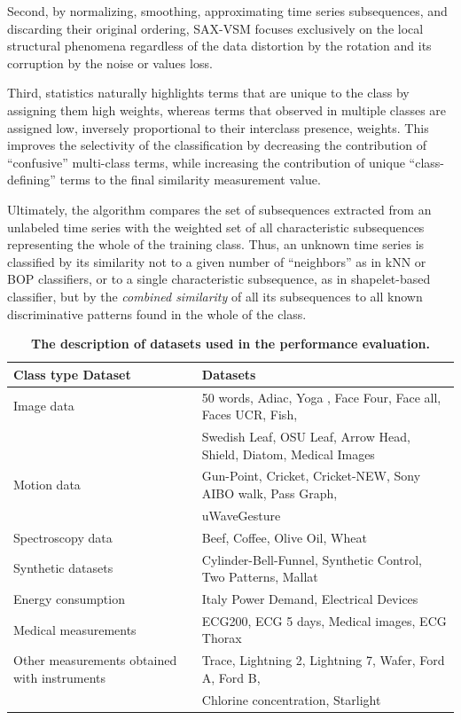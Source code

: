 Second, by normalizing, smoothing, approximating time series subsequences, and discarding their 
original ordering, SAX-VSM focuses exclusively on the local structural phenomena regardless of the 
data distortion by the rotation and its corruption by the noise or values loss.

Third,  \tfidf statistics naturally highlights terms that are unique to the class by assigning them high weights, 
whereas terms that observed in multiple classes are assigned low, 
inversely proportional to their interclass presence, weights. 
This improves the selectivity of the classification by decreasing the contribution of ``confusive'' multi-class terms, 
while increasing the contribution of unique ``class-defining'' terms to the final similarity measurement value.

Ultimately, the algorithm compares the set of subsequences extracted from an unlabeled time series 
with the weighted set of all characteristic subsequences representing the whole of the training class. 
Thus, an unknown time series is classified by its similarity not to a given number of 
``neighbors'' as in kNN or BOP classifiers, or to a single characteristic subsequence, as in shapelet-based classifier, 
but by the \textit{combined similarity} of all its subsequences to all known discriminative patterns found in the 
whole of the class.

\begin{table}[t]
\caption{\bf The description of datasets used in the performance evaluation.}
\vspace{0.4cm}
 \label{data_typetable1}
\centering
{\setlength{\extrarowheight}{2pt}%
{\footnotesize
\begin{tabularx}{\linewidth}{@{} l l @{}}
\hline
Class type Dataset & Datasets \\[0.5ex]
\hline
Image data & 50 words, Adiac, Yoga , Face Four, Face all, Faces UCR, Fish, \\
 & Swedish Leaf, OSU Leaf, Arrow Head, Shield, Diatom, Medical Images \\[0.5ex]
Motion data & Gun-Point, Cricket, Cricket-NEW, Sony AIBO walk, Pass Graph, \\ 
 & uWaveGesture \\[0.5ex]
Spectroscopy data & Beef, Coffee, Olive Oil, Wheat \\[0.5ex]
Synthetic datasets & Cylinder-Bell-Funnel, Synthetic Control, Two Patterns, Mallat \\[0.5ex]
Energy consumption & Italy Power Demand, Electrical Devices \\[0.5ex]
Medical measurements & ECG200, ECG 5 days, Medical images, ECG Thorax \\[0.5ex]
Other measurements obtained with instruments & Trace, Lightning 2, Lightning 7, Wafer, Ford A, Ford B, \\
 & Chlorine concentration, Starlight \\[0.5ex]
\hline
\end{tabularx}
}}
\end{table}

